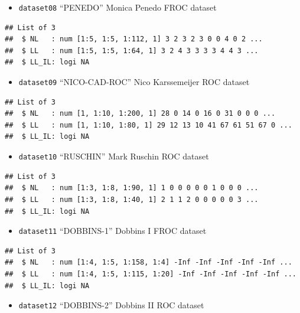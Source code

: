 \documentclass[
]{book}
\providecommand{\tightlist}{%
  \setlength{\itemsep}{0pt}\setlength{\parskip}{0pt}}
\begin{document}
\begin{itemize}
\tightlist
\item
  \texttt{dataset08} ``PENEDO'' Monica Penedo FROC dataset \citep{RN1520}
\end{itemize}

\begin{verbatim}
## List of 3
##  $ NL   : num [1:5, 1:5, 1:112, 1] 3 2 3 2 3 0 0 4 0 2 ...
##  $ LL   : num [1:5, 1:5, 1:64, 1] 3 2 4 3 3 3 3 4 4 3 ...
##  $ LL_IL: logi NA
\end{verbatim}

\begin{itemize}
\tightlist
\item
  \texttt{dataset09} ``NICO-CAD-ROC'' Nico Karssemeijer ROC dataset \citep{hupse2013standalone}
\end{itemize}

\begin{verbatim}
## List of 3
##  $ NL   : num [1, 1:10, 1:200, 1] 28 0 14 0 16 0 31 0 0 0 ...
##  $ LL   : num [1, 1:10, 1:80, 1] 29 12 13 10 41 67 61 51 67 0 ...
##  $ LL_IL: logi NA
\end{verbatim}

\begin{itemize}
\tightlist
\item
  \texttt{dataset10} ``RUSCHIN'' Mark Ruschin ROC dataset \citep{RN1646}
\end{itemize}

\begin{verbatim}
## List of 3
##  $ NL   : num [1:3, 1:8, 1:90, 1] 1 0 0 0 0 0 1 0 0 0 ...
##  $ LL   : num [1:3, 1:8, 1:40, 1] 2 1 1 2 0 0 0 0 0 3 ...
##  $ LL_IL: logi NA
\end{verbatim}

\begin{itemize}
\tightlist
\item
  \texttt{dataset11} ``DOBBINS-1'' Dobbins I FROC dataset \citep{Dobbins2016MultiInstitutional}
\end{itemize}

\begin{verbatim}
## List of 3
##  $ NL   : num [1:4, 1:5, 1:158, 1:4] -Inf -Inf -Inf -Inf -Inf ...
##  $ LL   : num [1:4, 1:5, 1:115, 1:20] -Inf -Inf -Inf -Inf -Inf ...
##  $ LL_IL: logi NA
\end{verbatim}

\begin{itemize}
\tightlist
\item
  \texttt{dataset12} ``DOBBINS-2'' Dobbins II ROC dataset \citep{Dobbins2016MultiInstitutional}
\end{itemize}
\end{document}
